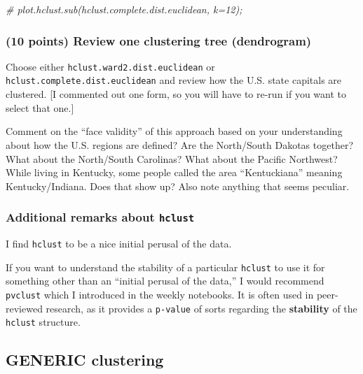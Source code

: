 \documentclass[
]{article}
\newenvironment{Shaded}{\begin{snugshade}}{\end{snugshade}}
\newcommand{\CommentTok}[1]{\textcolor[rgb]{0.56,0.35,0.01}{\textit{#1}}}
\begin{document}
\begin{Shaded}
\begin{Highlighting}[]
\CommentTok{\# plot.hclust.sub(hclust.complete.dist.euclidean, k=12);}
\end{Highlighting}
\end{Shaded}

\hypertarget{points-review-one-clustering-tree-dendrogram}{%
\subsubsection{(10 points) Review one clustering tree
(dendrogram)}\label{points-review-one-clustering-tree-dendrogram}}

Choose either \texttt{hclust.ward2.dist.euclidean} or
\texttt{hclust.complete.dist.euclidean} and review how the U.S. state
capitals are clustered. {[}I commented out one form, so you will have to
re-run if you want to select that one.{]}

Comment on the ``face validity'' of this approach based on your
understanding about how the U.S. regions are defined? Are the
North/South Dakotas together? What about the North/South Carolinas? What
about the Pacific Northwest? While living in Kentucky, some people
called the area ``Kentuckiana'' meaning Kentucky/Indiana. Does that show
up? Also note anything that seems peculiar.

\hypertarget{additional-remarks-about-hclust}{%
\subsubsection{\texorpdfstring{Additional remarks about
\texttt{hclust}}{Additional remarks about hclust}}\label{additional-remarks-about-hclust}}

I find \texttt{hclust} to be a nice initial perusal of the data.

If you want to understand the stability of a particular \texttt{hclust}
to use it for something other than an ``initial perusal of the data,'' I
would recommend \texttt{pvclust} which I introduced in the weekly
notebooks. It is often used in peer-reviewed research, as it provides a
\texttt{p-value} of sorts regarding the \textbf{stability} of the
\texttt{hclust} structure.

\hypertarget{generic-clustering}{%
\subsection{GENERIC clustering}\label{generic-clustering}}
\end{document}

